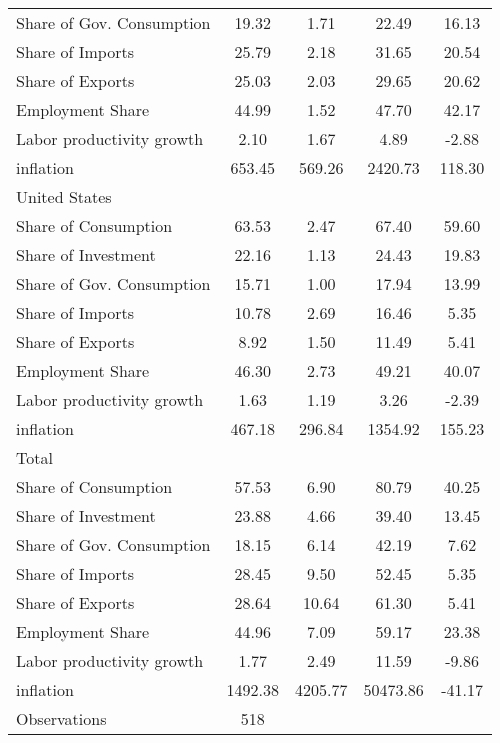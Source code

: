 {\begin{longtable}{l*{1}{cccc}}
Share of Gov. Consumption&       19.32&        1.71&       22.49&       16.13\\
Share of Imports    &       25.79&        2.18&       31.65&       20.54\\
Share of Exports    &       25.03&        2.03&       29.65&       20.62\\
Employment Share    &       44.99&        1.52&       47.70&       42.17\\
Labor productivity growth&        2.10&        1.67&        4.89&       -2.88\\
inflation           &      653.45&      569.26&     2420.73&      118.30\\
United States       &            &            &            &            \\
Share of Consumption&       63.53&        2.47&       67.40&       59.60\\
Share of Investment &       22.16&        1.13&       24.43&       19.83\\
Share of Gov. Consumption&       15.71&        1.00&       17.94&       13.99\\
Share of Imports    &       10.78&        2.69&       16.46&        5.35\\
Share of Exports    &        8.92&        1.50&       11.49&        5.41\\
Employment Share    &       46.30&        2.73&       49.21&       40.07\\
Labor productivity growth&        1.63&        1.19&        3.26&       -2.39\\
inflation           &      467.18&      296.84&     1354.92&      155.23\\
Total               &            &            &            &            \\
Share of Consumption&       57.53&        6.90&       80.79&       40.25\\
Share of Investment &       23.88&        4.66&       39.40&       13.45\\
Share of Gov. Consumption&       18.15&        6.14&       42.19&        7.62\\
Share of Imports    &       28.45&        9.50&       52.45&        5.35\\
Share of Exports    &       28.64&       10.64&       61.30&        5.41\\
Employment Share    &       44.96&        7.09&       59.17&       23.38\\
Labor productivity growth&        1.77&        2.49&       11.59&       -9.86\\
inflation           &     1492.38&     4205.77&    50473.86&      -41.17\\
\hline
Observations        &         518&            &            &            \\
\hline\hline
\end{longtable}
}
